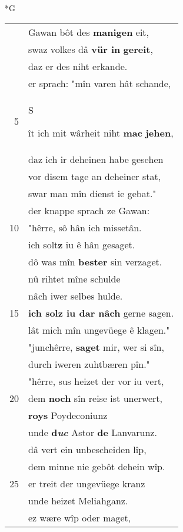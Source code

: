 \documentclass[8pt,a4paper,notitlepage]{article}
\begin{document}
\newpage
\begin{table}[ht]
\begin{minipage}[t]{0.5\linewidth}
\small
\begin{center}*G
\end{center}
\begin{tabular}{rl}
 & Gawan bôt des \textbf{manigen} eit,\\ 
 & swaz volkes dâ \textbf{vür in} \textbf{gereit},\\ 
 & daz er des niht erkande.\\ 
 & er sprach: "mîn varen hât schande,\\ 
5 & \begin{large}S\end{large}ît ich mit wârheit niht \textbf{mac} \textbf{jehen},\\ 
 & daz ich ir deheinen habe gesehen\\ 
 & vor disem tage an deheiner stat,\\ 
 & swar man mîn dienst ie gebat."\\ 
 & der knappe sprach ze Gawan:\\ 
10 & "hêrre, sô hân ich missetân.\\ 
 & ich solt\textbf{z} iu ê hân gesaget.\\ 
 & dô was mîn \textbf{bester} sin verzaget.\\ 
 & nû rihtet mîne schulde\\ 
 & nâch iwer selbes hulde.\\ 
15 & \textbf{ich solz iu dar nâch} gerne sagen.\\ 
 & lât mich mîn ungevüege ê klagen."\\ 
 & "junchêrre, \textbf{saget} mir, wer si sîn,\\ 
 & durch iweren zuhtbæren pîn."\\ 
 & "hêrre, sus heizet der vor iu vert,\\ 
20 & dem \textbf{noch} sîn reise ist unerwert,\\ 
 & \textbf{roys} Poydeconiunz\\ 
 & unde \textbf{d\textit{uc}} Astor \textbf{de} Lanvarunz.\\ 
 & dâ vert ein unbescheiden lîp,\\ 
 & dem minne nie gebôt dehein wîp.\\ 
25 & er treit der ungevüege kranz\\ 
 & unde heizet Meliahganz.\\ 
 & ez wære wîp oder maget,\\ 

\end{tabular}
\end{minipage}
\end{table}
\end{document}
